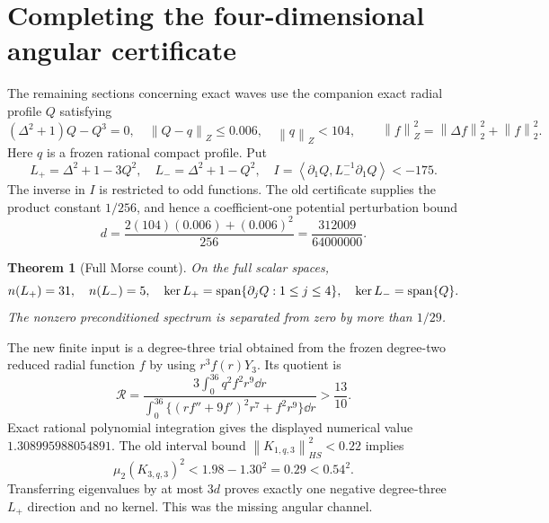 \documentclass[11pt,a4paper]{article}
\newtheorem{theorem}{Theorem}[section]
\theoremstyle{remark}\newtheorem{remark}[theorem]{Remark}
\newcommand{\norm}[1]{\left\|#1\right\|}
\newcommand{\ip}[2]{\left\langle #1,#2\right\rangle}
\begin{document}
\section{Completing the four-dimensional angular certificate}
The remaining sections concerning exact waves use the companion exact radial profile $Q$ satisfying
\[
 (\Delta^2+1)Q-Q^3=0,\quad\norm{Q-q}_Z\le0.006,\quad\norm q_Z<104,
 \qquad\norm f_Z^2=\norm{\Delta f}_2^2+\norm f_2^2.
\]
Here $q$ is a frozen rational compact profile. Put
\[
 L_+=\Delta^2+1-3Q^2,\quad L_-=\Delta^2+1-Q^2,
 \quad I=\ip{\partial_1Q}{L_-^{-1}\partial_1Q}<-175.
\]
The inverse in $I$ is restricted to odd functions. The old certificate supplies the product constant $1/256$, and hence a coefficient-one potential perturbation bound
\[
 d=\frac{2(104)(0.006)+(0.006)^2}{256}
 =\frac{312009}{64000000}.
\]

\begin{theorem}[Full Morse count]\label{thm:morse}
On the full scalar spaces,
\[
 n(L_+)=31,\quad n(L_-)=5,\quad
 \ker L_+=\operatorname{span}\{\partial_jQ:1\le j\le4\},\quad\ker L_-=\operatorname{span}\{Q\}.
\]
The nonzero preconditioned spectrum is separated from zero by more than $1/29$.
\end{theorem}

The new finite input is a degree-three trial obtained from the frozen degree-two reduced radial function $f$ by using $r^3f(r)Y_3$. Its quotient is
\[
 \mathcal R=
 \frac{3\int_0^{36}q^2 f^2r^9\dd r}
 {\int_0^{36}\{(rf''+9f')^2r^7+f^2r^9\}\dd r}
 >\frac{13}{10}.
\]
Exact rational polynomial integration gives the displayed numerical value $1.308995988054891$. The old interval bound $\norm{K_{1,q,3}}_{HS}^2<0.22$ implies
\[
 \mu_2(K_{3,q,3})^2<1.98-1.30^2=0.29<0.54^2.
\]
Transferring eigenvalues by at most $3d$ proves exactly one negative degree-three $L_+$ direction and no kernel. This was the missing angular channel.
\end{document}
